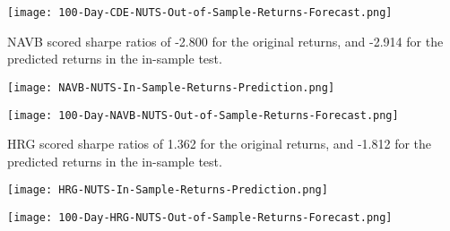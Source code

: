 \begin{center}  
    \texttt{[image: 100-Day-CDE-NUTS-Out-of-Sample-Returns-Forecast.png]}
    \label{fig:nonfloat}
\end{center}

NAVB scored sharpe ratios of -2.800 for the original returns, and -2.914 for the predicted returns in the in-sample test.

\begin{center}
    \texttt{[image: NAVB-NUTS-In-Sample-Returns-Prediction.png]}
    \label{fig:nonfloat}
\end{center}

\begin{center}  
    \texttt{[image: 100-Day-NAVB-NUTS-Out-of-Sample-Returns-Forecast.png]}
    \label{fig:nonfloat}
\end{center}

HRG scored sharpe ratios of 1.362 for the original returns, and -1.812 for the predicted returns in the in-sample test.

\begin{center}
    \texttt{[image: HRG-NUTS-In-Sample-Returns-Prediction.png]}
    \label{fig:nonfloat}
\end{center}

\begin{center}  
    \texttt{[image: 100-Day-HRG-NUTS-Out-of-Sample-Returns-Forecast.png]}
    \label{fig:nonfloat}
\end{center}